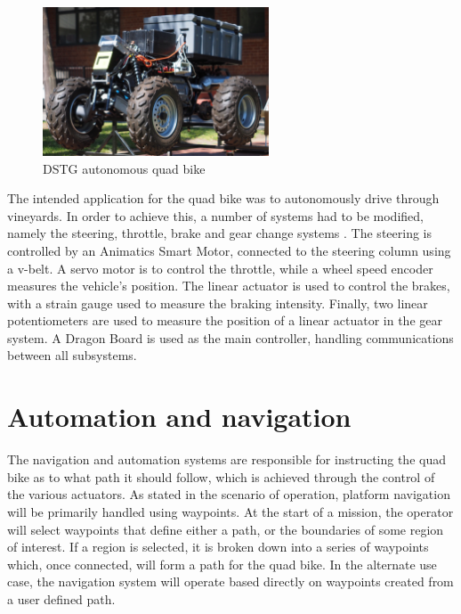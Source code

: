 \documentclass[main.tex]{subfiles}
\begin{document}
\begin{figure}[ht]
\includegraphics[width=0.6\textwidth]{3-ConceptDesign/bike.JPG}
\centering
\caption{DSTG autonomous quad bike} 
\end{figure}

The intended application for the quad bike was to autonomously drive through vineyards. In order to achieve this, a number of systems had to be modified, namely the steering, throttle, brake and gear change systems \parencite{scheiner2011}. The steering is controlled by an Animatics Smart Motor, connected to the steering column using a v-belt. A servo motor is to control the throttle, while a wheel speed encoder measures the vehicle's position. The linear actuator is used to control the brakes, with a strain gauge used to measure the braking intensity. Finally, two linear potentiometers are used to measure the position of a linear actuator in the gear system. A Dragon Board is used as the main controller, handling communications between all subsystems. 

\section{Automation and navigation}
The navigation and automation systems are responsible for instructing the quad bike as to what path it should follow, which is achieved through the control of the various actuators. As stated in the scenario of operation, platform navigation will be primarily handled using waypoints. At the start of a mission, the operator will select waypoints that define either a path, or the boundaries of some region of interest. If a region is selected, it is broken down into a series of waypoints which, once connected, will form a path for the quad bike. In the alternate use case, the navigation system will operate based directly on waypoints created from a user defined path.
\end{document}
